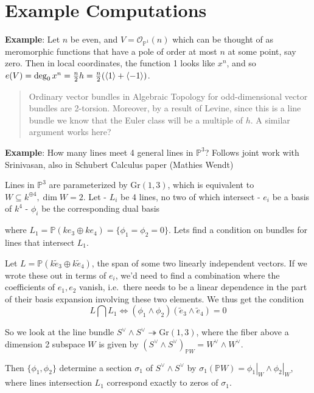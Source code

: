 \documentclass[11pt]{scrreprt}
\theoremstyle{definition}
\newcommand{\PP}[0]{{\mathbb{P}}}
\newcommand{\Gr}[0]{{\text{Gr}}}
\newcommand{\OO}[0]{{\mathcal{O}}}
\newcommand{\dual}[0]{\vee}
\newcommand{\generators}[1]{\langle{#1}\rangle}
\newcommand{\theset}[1]{\{{#1}\}}
\newcommand{\restrictionof}[2]{{\left.{#1}\right|_{#2}}}
\newcommand{\intersect}[0]{\bigcap}
\newcommand{\covers}[0]{\twoheadrightarrow}
\begin{document}
\hypertarget{example-computations}{%
\section{Example Computations}\label{example-computations}}

\textbf{Example}: Let \(n\) be even, and \(V = \OO_{\PP^1}(n)\) which
can be thought of as meromorphic functions that have a pole of order at
most \(n\) at some point, say zero. Then in local coordinates, the
function 1 looks like \(x^n\), and so
\(e(V) = \deg_0 x^n = {n\over 2} h = {n\over 2}(\generators{1} + \generators{-1})\).

\begin{quote}
Ordinary vector bundles in Algebraic Topology for odd-dimensional vector
bundles are 2-torsion. Moreover, by a result of Levine, since this is a
line bundle we know that the Euler class will be a multiple of \(h\). A
similar argument works here?
\end{quote}

\textbf{Example}: How many lines meet 4 general lines in \(\PP^3\)?
Follows joint work with Srinivasan, also in Schubert Calculus paper
(Mathies Wendt)

Lines in \(\PP^3\) are parameterized by \(\Gr(1,3)\), which is
equivalent to \(W \subseteq k^{\oplus 4}, \dim W = 2\). Let - \(L_i\) be
4 lines, no two of which intersect - \(e_i\) be a basis of \(k^4\) -
\(\phi_i\) be the corresponding dual basis

where \(L_1 = \PP(ke_3\oplus ke_4) = \theset{\phi_1=\phi_2 = 0}\). Lets
find a condition on bundles for lines that intersect \(L_1\).

Let \(L= \PP(k\tilde e_3 \oplus k\tilde e_4)\), the span of some two
linearly independent vectors. If we wrote these out in terms of \(e_i\),
we'd need to find a combination where the coefficients of \(e_1, e_2\)
vanish, i.e.~there needs to be a linear dependence in the part of their
basis expansion involving these two elements. We thus get the condition
\[
L\intersect L_1 \iff (\phi_1 \wedge \phi_2)(\tilde e_3 \wedge \tilde e_4) = 0
\]

So we look at the line bundle
\(S^\dual \wedge S^\dual \covers \Gr(1,3)\), where the fiber above a
dimension 2 subspace \(W\) is given by
\((S^\dual \wedge S^\dual)_{\PP W} = W^\dual \wedge W^\dual\).

Then \(\theset{\phi_1, \phi_2}\) determine a section \(\sigma_1\) of
\(S^\dual \wedge S^\dual\) by
\(\sigma_1(\PP W) = \restrictionof{\phi_1}{W} \wedge \restrictionof{\phi_2}{W}\),
where lines intersection \(L_1\) correspond exactly to zeros of
\(\sigma_1\).
\end{document}
